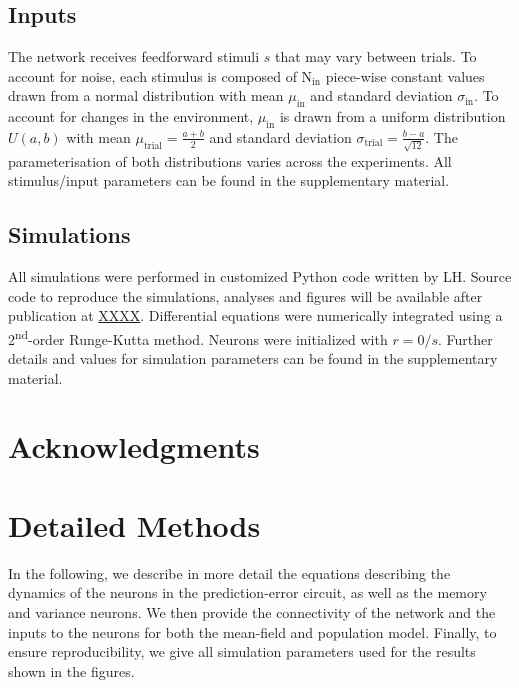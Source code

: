 \documentclass[10pt,a4paper,draft]{article}
\begin{document}
\subsection*{Inputs}
%
The network receives feedforward stimuli $s$ that may vary between trials. To account for noise, each stimulus is composed of N$_\mathrm{in}$ piece-wise constant values drawn from a normal distribution with mean $\mu_\mathrm{in}$ and standard deviation $\sigma_\mathrm{in}$. To account for changes in the environment, $\mu_\mathrm{in}$ is drawn from a uniform distribution $U(a,b)$ with mean $\mu_\mathrm{trial} = \frac{a+b}{2}$ and standard deviation $\sigma_\mathrm{trial} = \frac{b-a}{\sqrt{12}}$. The parameterisation of both distributions varies across the experiments. All stimulus/input parameters can be found in the supplementary material.

\subsection*{Simulations}
%
All simulations were performed in customized Python code written by LH. Source code to reproduce the simulations, analyses and figures will be available after publication at \url{XXXX}. Differential equations were numerically integrated using a 2\textsuperscript{nd}-order Runge-Kutta method. Neurons were initialized with $r=0/s$. Further details and values for simulation parameters can be found in the supplementary material.


\section*{Acknowledgments}
%







\clearpage
\appendix


\tableofcontents
\section{Detailed Methods}
%
In the following, we describe in more detail the equations describing the dynamics of the neurons in the prediction-error circuit, as well as the memory and variance neurons. We then provide the connectivity of the network and the inputs to the neurons for both the mean-field and population model. Finally, to ensure reproducibility, we give all simulation parameters used for the results shown in the figures.  
\end{document}
